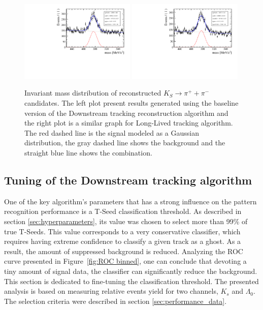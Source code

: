 \begin{figure}[tbph]
\begin{center}
\includegraphics[rotate=-90, width = 0.49\textwidth]{figures/tracking_ks/Mas_ks_baseline.pdf} 
\includegraphics[rotate=-90, width = 0.49\textwidth]{figures/tracking_ks/Mas_ks_bdt.pdf}
\caption{Invariant mass distribution of reconstructed $K_S \rightarrow \pi^{+} + \pi^{-}$ candidates.  The left plot present results generated using the baseline version of the Downstream tracking reconstruction algorithm and the right plot is a  similar graph for Long-Lived tracking algorithm. The red  dashed line is the signal modeled as a Gaussian distribution, the gray dashed line shows the background and the straight blue line shows the combination.}
\label{fig:Ks_performance}
 \end{center}
 \end{figure}




\subsection{Tuning of the Downstream tracking algorithm}
\label{sec:cut finetuning}

One of the key algorithm's parameters that has a strong influence on the pattern recognition performance is a T-Seed classification threshold. As described in section \ref{sec:hyperparameters}, its value was chosen to select more than 99\% of true T-Seeds. This value corresponds to a very conservative classifier, which requires having extreme confidence to classify a given track as a ghost. As a result, the amount of suppressed background is reduced. Analyzing the ROC curve presented in Figure~\ref{fig:ROC binned}, one can conclude that devoting a tiny amount of signal data, the classifier can significantly reduce the background. This section is dedicated to fine-tuning the classification threshold. The presented analysis is based on measuring relative events yield for two channels, $K_s$ and $\Lambda_0$. The selection criteria were described in section \ref{sec:performance_data}. 

